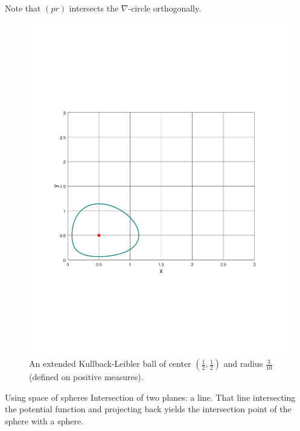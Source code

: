 \documentclass{article}
\begin{document}
Note that $(pr)$ intersects the $\nabla$-circle orthogonally.

\begin{figure}%
\includegraphics[width=0.8\columnwidth]{eKL-ball.pdf}%
\caption{An extended Kullback-Leibler ball of center $(\frac{1}{2},\frac{1}{2})$ and radius $\frac{3}{10}$ (defined on positive measures).}%
\label{}%
\end{figure}

Using space of spheres
Intersection of two planes: a line. That line intersecting the potential function and projecting back yields the intersection point of the sphere with a sphere.



\end{document}
